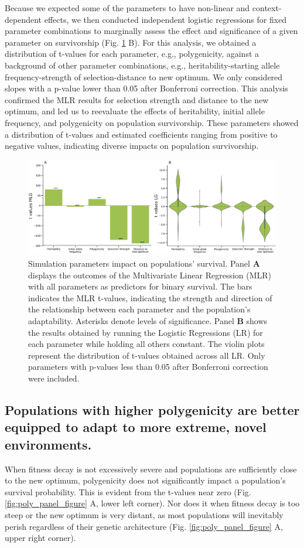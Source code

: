\documentclass{article}
\begin{document}
Because we expected some of the parameters to have non-linear and context-dependent effects, we then conducted independent logistic regressions for fixed parameter combinations to marginally assess the effect and significance of a given parameter on survivorship (Fig. \ref{fig:glm_logisticreg} B). For this analysis, we obtained a distribution of t-values for each parameter, e.g., polygenicity, against a background of other parameter combinations, e.g., heritability-starting allele frequency-strength of selection-distance to new optimum. We only considered slopes with a p-value lower than 0.05 after Bonferroni correction. This analysis confirmed the MLR results for selection strength and distance to the new optimum, and led us to reevaluate the effects of heritability, initial allele frequency, and polygenicity on population survivorship. These parameters showed a distribution of t-values and estimated coefficients ranging from positive to negative values, indicating diverse impacts on population survivorship.

\begin{figure}[h]
  \centering
  \includegraphics[width=1\textwidth]{figures/glm_logisticreg_newver.pdf}
  \caption{Simulation parameters impact on populations' survival. Panel \textbf{A} displays the outcomes of the Multivariate Linear Regression (MLR) with all parameters as predictors for binary survival. The bars indicates the MLR t-values, indicating the strength and direction of the relationship between each parameter and the population's adaptability. Asterisks denote levels of significance. Panel \textbf{B} shows the results obtained by running the
  Logistic Regressions (LR) for each parameter while holding all others constant. The violin plots represent the distribution of t-values obtained across all LR. Only parameters with p-values less than 0.05 after Bonferroni correction were included.}
  \label{fig:glm_logisticreg}
\end{figure}


\subsection{Populations with higher polygenicity are better equipped to adapt to more extreme, novel environments.}
When fitness decay is not excessively severe and populations are sufficiently close to the new optimum, polygenicity does not significantly impact a population’s survival probability. This is evident from the t-values near zero (Fig. \ref{fig:poly_panel_figure} A, lower left corner). Nor does it when fitness decay is too steep or the new optimum is very distant, as most populations will inevitably perish regardless of their genetic architecture (Fig. \ref{fig:poly_panel_figure} A, upper right corner).
\end{document}
